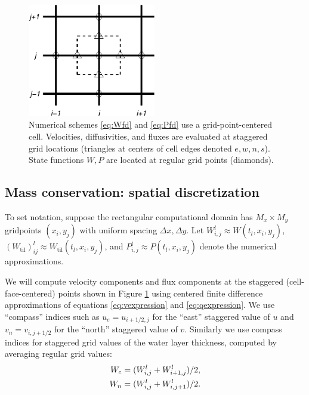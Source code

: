 \documentclass[gmd]{copernicus}   %
\newcommand{\text}{\textrm}
\newcommand{\Wtil}{W_{\text{til}}}
\newcommand{\Wlij}{W^l_{i,j}}
\newcommand{\Plij}{P^l_{i,j}}
\begin{document}
\begin{figure}[ht]
\centering
\includegraphics[width=2.2in,keepaspectratio=true]{diffstencil}
\bigskip
\caption{Numerical schemes \eqref{eq:Wfd} and \eqref{eq:Pfd} use a grid-point-centered cell.  Velocities, diffusivities, and fluxes are evaluated at staggered grid locations (triangles at centers of cell edges denoted $e,w,n,s$).  State functions $W,P$ are located at regular grid points (diamonds).}
\label{fig:stencil}
\end{figure}

\subsection{Mass conservation: spatial discretization}  To set notation, suppose the rectangular computational domain has $M_x \times M_y$ gridpoints $(x_i,y_j)$ with uniform spacing $\Delta x,\Delta y$.  Let $\Wlij \approx W(t_l,x_i,y_j)$, $(\Wtil)_{ij}^l \approx \Wtil(t_l,x_i,y_j)$, and $\Plij \approx P(t_l,x_i,y_j)$ denote the numerical approximations.

We will compute velocity components and flux components at the staggered (cell-face-centered) points shown in Figure \ref{fig:stencil} using centered finite difference approximations of equations \eqref{eq:vexpression} and \eqref{eq:qexpression}.  We use ``compass'' indices such as $u_e = u_{i+1/2,j}$ for the ``east'' staggered value of $u$ and $v_n = v_{i,j+1/2}$ for the ``north'' staggered value of $v$.  Similarly we use compass indices for staggered grid values of the water layer thickness, computed by averaging regular grid values:
\begin{align}
W_e &= (W_{i,j}^l + W_{i+1,j}^l)/2, \label{eq:stagW} \\
W_n &= (W_{i,j}^l + W_{i,j+1}^l)/2. \notag
\end{align}
\end{document}
